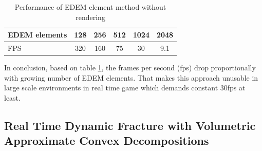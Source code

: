 \begin{table}[ht!]
    \begin{center}
  \begin{tabular}{ |l|c|c|c|c|c| } 
  \hline
  EDEM elements & 128 & 256 & 512 & 1024 & 2048 \\ 
  \hline
  FPS & 320 & 160 & 75 & 30 & 9.1 \\ 
  \hline
  
  \end{tabular}
  \end{center}
  \caption{Performance of EDEM element method without rendering \cite{edem}}
  \label{table1}
\end{table}
In conclusion, based on table \ref{table1}, the frames per second (fps) drop proportionally with growing number of EDEM elements. That makes this approach unusable in large scale environments in real time game which demands constant 30fps at least.

\subsection{Real Time Dynamic Fracture
with Volumetric Approximate Convex Decompositions}
\cite{nvidia}
